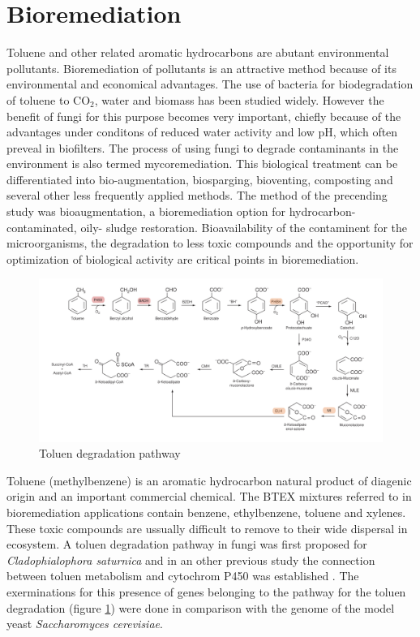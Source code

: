 \documentclass[12pt, a4paper]{report}
\begin{document}
\section{Bioremediation}
Toluene and other related aromatic hydrocarbons are abutant environmental pollutants. Bioremediation of pollutants is an attractive method because of its
environmental and economical advantages. The use of bacteria for biodegradation of toluene to CO$_2$, water and biomass has been studied widely. However the benefit of fungi for this purpose becomes very important, chiefly because of the advantages under conditons of reduced water activity and low pH, which often preveal in biofilters. \cite{Luykx2003} The process of using fungi to degrade contaminants in the environment is also termed mycoremediation. This biological treatment can be differentiated into bio-augmentation, biosparging, bioventing, composting and several other less frequently applied methods. The method of the precending study was bioaugmentation, a bioremediation option for hydrocarbon-contaminated, oily- sludge restoration. Bioavailability of the contaminent for the microorganisms, the degradation to less toxic compounds and the opportunity for optimization of biological activity are critical points in bioremediation. \cite{Poyntner2014} \\

\begin{figure}[H]
	\centering	
	\includegraphics[width=400pt]{pics/Toluendeg.png}
	\caption[Toluen degradation pathway]
	{Toluen degradation pathway}
	\label{Toluendeg}
\end{figure}

Toluene (methylbenzene) is an aromatic hydrocarbon natural product of diagenic origin and an important commercial chemical. The BTEX mixtures referred to in bioremediation applications contain benzene, ethylbenzene, toluene and xylenes. These toxic compounds are ussually difficult to remove to their wide dispersal in ecosystem.  A toluen degradation pathway in fungi was first proposed for \textit{Cladophialophora saturnica} \cite{Badali2008} and in an other previous study the connection between toluen metabolism and cytochrom P450 was established \cite{Luykx2003}. The exerminations for this presence of genes belonging to the pathway for the toluen degradation (figure \ref{Toluendeg}) were done in comparison with the genome of the model yeast \textit{Saccharomyces cerevisiae}. \cite{BarbaraBlasi2015} \\
\end{document}

